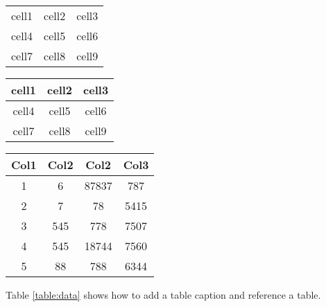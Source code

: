 \documentclass{article}
\begin{document}
\begin{center}
    \begin{tabular}{c c c}
        cell1 & cell2 & cell3 \\ 
        cell4 & cell5 & cell6 \\  
        cell7 & cell8 & cell9    
    \end{tabular}

    \begin{tabular}{|c|c|c|} 
        \hline
        cell1 & cell2 & cell3 \\
        \hline
        cell4 & cell5 & cell6 \\
        \hline
        cell7 & cell8 & cell9 \\
        \hline
    \end{tabular}

    \begin{tabular}{||c c c c||} 
        \hline
        Col1 & Col2 & Col2 & Col3 \\ [0.5ex] 
        \hline\hline
        1 & 6 & 87837 & 787 \\ 
        \hline
        2 & 7 & 78 & 5415 \\
        \hline
        3 & 545 & 778 & 7507 \\
        \hline
        4 & 545 & 18744 & 7560 \\
        \hline
        5 & 88 & 788 & 6344 \\ [1ex] 
        \hline
    \end{tabular}

\end{center}

Table \ref{table:data} shows how to add a table caption and reference a table.
\end{document}

